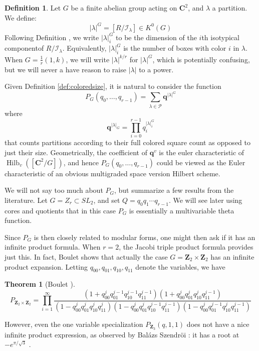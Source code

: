 \documentclass{amsart}[12pt]
\theoremstyle{definition}
\newtheorem{theorem}[dummy]{Theorem}
\newtheorem{definition}[dummy]{Definition}
\newcommand{\Z}{\mathbf{Z}}
\newcommand{\C}{\mathbf{C}}
\newcommand{\II}{\mathcal{I}}
\DeclareMathOperator{\Hilb}{Hilb}
\begin{document}
\begin{definition} \label{def:coloredsize}
  Let $G$ be a finite abelian group acting on $\C^2$, and $\lambda$ a partition.  We define:
  $$|\lambda|^G=[R/\II_\lambda]\in K^0(G)$$
  Following Definition , we write $|\lambda|^G_i$ to be the dimension of the $i$th isotypical componentof $R/\II_\lambda$.  Equivalently, $|\lambda|^G_i$ is the number of boxes with color $i$ in $\lambda$.
  When $G=\frac{1}{r}(1,k)$, we will write $|\lambda|^{k/r}$ for $|\lambda|^G$, which is potentially confusing, but we will never a have reason to raise $|\lambda|$ to a power.
\end{definition}

Given Definition \eqref{def:coloredsize}, it is natural to consider the function
$$P_G(q_0,\dots,q_{r-1})=\sum_{\lambda\in\mathcal{P}} \mathbf{q}^{|\lambda|^G}$$
where 
$$\mathbf{q}^{|\lambda|_G}=\prod_{i=0}^{r-1} q_i^{|\lambda|^G_i}$$
that counts partitions according to their full colored square count as opposed to just their size.  Geometrically, the coefficient of $\mathbf{q}^v$ is the euler characteristic of $\Hilb_v([\C^2/G])$, and hence $P_G(q_0,\dots,q_{r-1})$ could be viewed as the Euler characteristic of an obvious multigraded space version Hilbert scheme.


We will not say too much about $P_G$, but summarize a few results from the literature.  Let $G=Z_r\subset SL_2$, and set $Q=q_0q_1\cdots q_{r-1}$.  We will see later using cores and quotients that in this case $P_G$ is essentially a multivariable theta function.  

Since $P_G$ is then closely related to modular forms, one might then ask if it has an infinite product formula.  When $r=2$, the Jacobi triple product formula provides just this.  In fact, Boulet \cite{boulet} shows that actually the case $G=\Z_2\times \Z_2$ has an infinite product expansion.  Letting $q_{00}, q_{01}, q_{10}, q_{11}$ denote the variables, we have

\begin{theorem}[Boulet \cite{boulet}]
$$P_{\Z_2\times\Z_2}=\prod_{i=1}^\infty \frac{(1+q_{00}^jq_{01}^{j-1}q_{10}^{j-1}q_{11}^{j-1})(1+q_{00}^jq_{01}^jq_{10}^jq_{11}^{j-1})}{(1-q_{00}^jq_{01}^jq_{10}^jq_{11}^j)(1-q_{00}^jq_{01}^jq_{10}^{j-1}q_{11}^{j-1})(1-q_{00}^jq_{01}^{j-1}q_{10}^{j}q_{11}^{j-1})}$$
\end{theorem}

However, even the one variable specialization $P_{\Z_3}(q,1,1)$ does not have a nice infinite product expression, as observed by Bal\'azs Szendr\"oi \cite{Bmo}: it has a root at $-e^{\pi/\sqrt{3}}$ \cite{Borwein2}.
\end{document}
